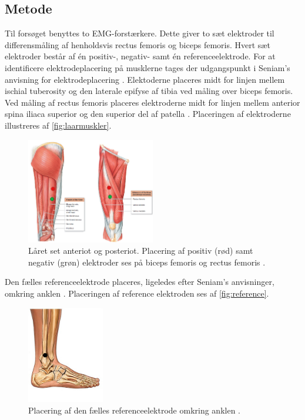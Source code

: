 \subsection{Metode}
Til forsøget benyttes to EMG-forstærkere. Dette giver to sæt elektroder til differensmåling af henholdsvis rectus femoris og biceps femoris. Hvert sæt elektroder består af én positiv-, negativ- samt én referenceelektrode. 
For at identificere elektrodeplacering på musklerne tages der udgangspunkt i Seniam's anvisning for elektrodeplacering \citep{seniam2016}. 
Elektoderne placeres midt for linjen mellem ischial tuberosity og den laterale epifyse af tibia ved måling over biceps femoris. Ved måling af rectus femoris placeres elektroderne midt for linjen mellem anterior spina iliaca superior og den superior del af patella \citep{seniam2016}. Placeringen af elektroderne illustreres af \autoref{fig:laarmuskler}. 

\begin{figure}[H]
\centering
\includegraphics[width=0.5\textwidth]{figures/laarmuskler.png}
\caption{Låret set anteriot og posteriot. Placering af positiv (rød) samt negativ (grøn) elektroder ses på biceps femoris og rectus femoris \citep{martini2012}.}
\label{fig:laarmuskler}
\end{figure}

Den fælles referenceelektrode placeres, ligeledes efter Seniam's anvisninger, omkring anklen \citep{seniam2016}. Placeringen af reference elektroden ses af \autoref{fig:reference}.

\begin{figure}[H]
\centering
\includegraphics[width=0.3\textwidth]{figures/reference}
\caption{Placering af den fælles referenceelektrode omkring anklen \citep{ankle2016}.}
\label{fig:reference}
\end{figure}

